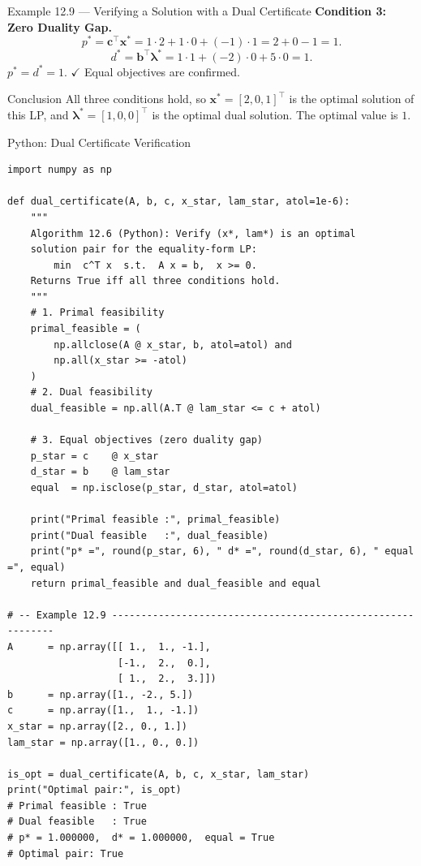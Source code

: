 \documentclass[aspectratio=169,10pt]{beamer}
\newcommand{\xv}{\mathbf{x}}
\newcommand{\cv}{\mathbf{c}}
\newcommand{\bv}{\mathbf{b}}
\newcommand{\lav}{\boldsymbol{\lambda}}
\begin{document}
\begin{frame}[allowframebreaks]{Example 12.9 --- Verifying a Solution with a Dual Certificate}
\textbf{Condition 3: Zero Duality Gap.}
\[
  p^* = \cv^\top\xv^* = 1\cdot2 + 1\cdot0 + (-1)\cdot1 = 2 + 0 - 1 = 1.
\]
\[
  d^* = \bv^\top\lav^* = 1\cdot1 + (-2)\cdot0 + 5\cdot0 = 1.
\]
$p^* = d^* = 1$. $\checkmark$  Equal objectives are confirmed.

\begin{alertblock}{Conclusion}
All three conditions hold, so $\xv^* = [2,0,1]^\top$ is the optimal solution of this LP,
and $\lav^* = [1,0,0]^\top$ is the optimal dual solution.  The optimal value is $1$.
\end{alertblock}

\end{frame}

\begin{frame}[fragile]{Python: Dual Certificate Verification}
\begin{lstlisting}
import numpy as np

def dual_certificate(A, b, c, x_star, lam_star, atol=1e-6):
    """
    Algorithm 12.6 (Python): Verify (x*, lam*) is an optimal
    solution pair for the equality-form LP:
        min  c^T x  s.t.  A x = b,  x >= 0.
    Returns True iff all three conditions hold.
    """
    # 1. Primal feasibility
    primal_feasible = (
        np.allclose(A @ x_star, b, atol=atol) and
        np.all(x_star >= -atol)
    )
    # 2. Dual feasibility
    dual_feasible = np.all(A.T @ lam_star <= c + atol)

    # 3. Equal objectives (zero duality gap)
    p_star = c    @ x_star
    d_star = b    @ lam_star
    equal  = np.isclose(p_star, d_star, atol=atol)

    print("Primal feasible :", primal_feasible)
    print("Dual feasible   :", dual_feasible)
    print("p* =", round(p_star, 6), " d* =", round(d_star, 6), " equal =", equal)
    return primal_feasible and dual_feasible and equal

# -- Example 12.9 ------------------------------------------------------------
A      = np.array([[ 1.,  1., -1.],
                   [-1.,  2.,  0.],
                   [ 1.,  2.,  3.]])
b      = np.array([1., -2., 5.])
c      = np.array([1.,  1., -1.])
x_star = np.array([2., 0., 1.])
lam_star = np.array([1., 0., 0.])

is_opt = dual_certificate(A, b, c, x_star, lam_star)
print("Optimal pair:", is_opt)
# Primal feasible : True
# Dual feasible   : True
# p* = 1.000000,  d* = 1.000000,  equal = True
# Optimal pair: True
\end{lstlisting}
\end{frame}
\end{document}
